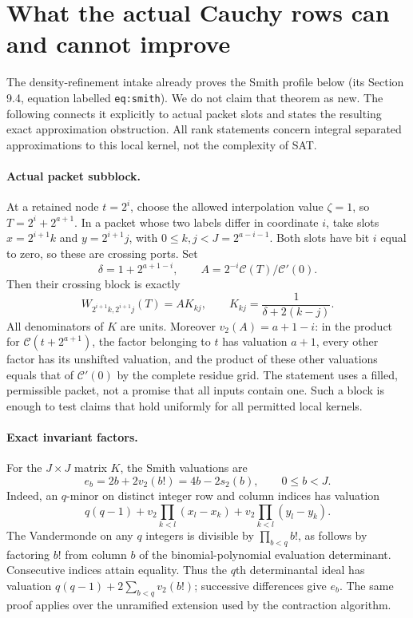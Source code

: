 \section{What the actual Cauchy rows can and cannot improve}
The density-refinement intake already proves the Smith profile below
(its Section 9.4, equation labelled \texttt{eq:smith}). We do not claim
that theorem as new. The following connects it explicitly to actual
packet slots and states the resulting exact approximation obstruction.
All rank statements concern integral separated approximations to this
local kernel, not the complexity of SAT.

\paragraph{Actual packet subblock.}
At a retained node $t=2^i$, choose the allowed interpolation value
$\zeta=1$, so $T=2^i+2^{a+1}$. In a packet whose two labels differ
in coordinate $i$, take slots
$x=2^{i+1}k$ and $y=2^{i+1}j$, with $0\le k,j<J=2^{a-i-1}$.
Both slots have bit $i$ equal to zero, so these are crossing ports.
Set
\[
 \delta=1+2^{a+1-i},\qquad
 A=2^{-i}\mathcal C(T)/\mathcal C'(0).
\]
Then their crossing block is exactly
\[
 W_{2^{i+1}k,2^{i+1}j}(T)
 =A K_{kj},\qquad K_{kj}=\frac1{\delta+2(k-j)}.
\]
All denominators of $K$ are units. Moreover $v_2(A)=a+1-i$:
in the product for $\mathcal C(t+2^{a+1})$, the factor belonging to
$t$ has valuation $a+1$, every other factor has its unshifted
valuation, and the product of these other valuations equals that of
$\mathcal C'(0)$ by the complete residue grid.
The statement uses a filled, permissible packet, not a promise that
all inputs contain one. Such a block is enough to test claims that
hold uniformly for all permitted local kernels.

\paragraph{Exact invariant factors.}
For the $J\times J$ matrix $K$, the Smith valuations are
\[
 e_b=2b+2v_2(b!)=4b-2s_2(b),\qquad 0\le b<J.
\]
Indeed, an $q$-minor on distinct integer row and column indices has
valuation
\[
 q(q-1)+v_2\!\prod_{k<l}(x_l-x_k)
       +v_2\!\prod_{k<l}(y_l-y_k).
\]
The Vandermonde on any $q$ integers is divisible by
$\prod_{b<q}b!$, as follows by factoring $b!$ from column $b$ of
the binomial-polynomial evaluation determinant. Consecutive indices
attain equality. Thus the $q$th determinantal ideal has valuation
$q(q-1)+2\sum_{b<q}v_2(b!)$; successive differences give $e_b$.
The same proof applies over the unramified extension used by the
contraction algorithm.


